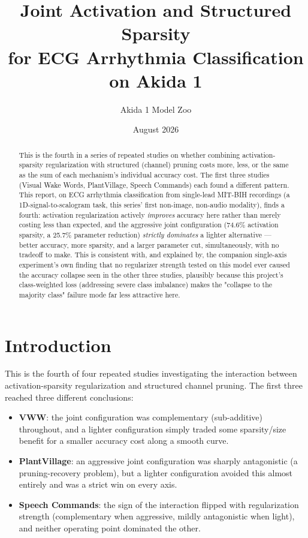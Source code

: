 \documentclass[11pt]{article}
\title{Joint Activation and Structured Sparsity\\ for ECG Arrhythmia Classification on Akida 1}
\author{Akida 1 Model Zoo}
\date{August 2026}
\begin{document}
\maketitle

\begin{abstract}
This is the fourth in a series of repeated studies on whether combining activation-sparsity regularization with structured (channel) pruning costs more, less, or the same as the sum of each mechanism's individual accuracy cost. The first three studies (Visual Wake Words, PlantVillage, Speech Commands) each found a different pattern. This report, on ECG arrhythmia classification from single-lead MIT-BIH recordings (a 1D-signal-to-scalogram task, this series' first non-image, non-audio modality), finds a fourth: activation regularization actively \emph{improves} accuracy here rather than merely costing less than expected, and the aggressive joint configuration (74.6\% activation sparsity, a 25.7\% parameter reduction) \emph{strictly dominates} a lighter alternative --- better accuracy, more sparsity, and a larger parameter cut, simultaneously, with no tradeoff to make. This is consistent with, and explained by, the companion single-axis experiment's own finding that no regularizer strength tested on this model ever caused the accuracy collapse seen in the other three studies, plausibly because this project's class-weighted loss (addressing severe class imbalance) makes the "collapse to the majority class" failure mode far less attractive here.
\end{abstract}

\tableofcontents

\section{Introduction}

This is the fourth of four repeated studies investigating the interaction between activation-sparsity regularization and structured channel pruning. The first three reached three different conclusions:

\begin{itemize}
    \item \textbf{VWW}: the joint configuration was complementary (sub-additive) throughout, and a lighter configuration simply traded some sparsity/size benefit for a smaller accuracy cost along a smooth curve.
    \item \textbf{PlantVillage}: an aggressive joint configuration was sharply antagonistic (a pruning-recovery problem), but a lighter configuration avoided this almost entirely and was a strict win on every axis.
    \item \textbf{Speech Commands}: the sign of the interaction flipped with regularization strength (complementary when aggressive, mildly antagonistic when light), and neither operating point dominated the other.
\end{itemize}
\end{document}
